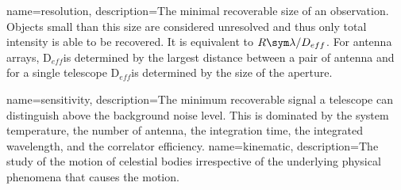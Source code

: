 {
{
        name=resolution,
        description={The minimal recoverable size of an observation. Objects small than this size are considered unresolved and thus only total intensity is able to be recovered. It is equivalent to $R \sym\lambda / D_{eff}$. For antenna arrays, D$_{eff}$\space is determined by the largest distance between a pair of antenna and for a single telescope D$_{eff}$\space is determined by the size of the aperture.}
}

{
        name=sensitivity,
        description={The minimum recoverable signal a telescope can distinguish above the background noise level. This is dominated by the system temperature, the number of antenna, the integration time, the integrated wavelength, and the correlator efficiency.}
}
{
        name=kinematic,
        description={The study of the motion of celestial bodies irrespective of the underlying physical phenomena that causes the motion.}
}







}